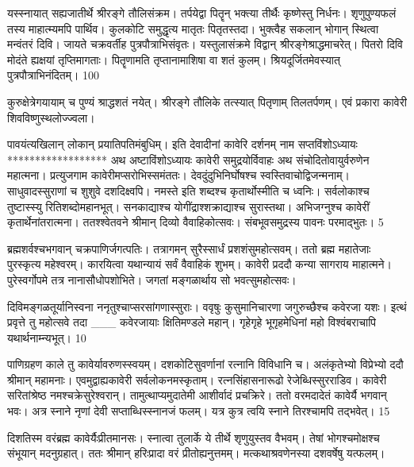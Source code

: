   यस्स्नायात् सह्यजातीर्थे श्रीरङ्गे तौलिसंक्रम।
 तर्पयेद्वा पितॄन् भक्त्या तीर्थैः कृष्णेस्तु निर्धनः।
 शृणुपुण्यफलं तस्य माहात्म्यमपि पार्थिव।
 कुलकोटि समुद्धृत्य मातृतः पितृतस्तदा।
 भुक्त्वैह सकलान् भोगान् स्थित्वा मन्वंतरं दिवि।
 जायते चक्रवर्तीह पुत्रपौत्राभिसंवृतः।
 यस्तुलासंक्रमे विद्वान् श्रीरङ्गेश्राद्धमाचरेत्।
 पितरो दिवि मोदंते ह्यक्षयां तृप्तिमागताः।
 पितॄणामति तृप्तानामाशिषा वा शतं कुलम्।
 श्रियदूर्जितमेवस्यात् पुत्रपौत्राभिनंदितम्।
 100

  कुरुक्षेत्रेगयायाम् च पुण्यं श्राद्धशतं नयेत्।
 श्रीरङ्गे तौलिके तत्स्यात् पितृणाम् तिलतर्पणम्।
 एवं प्रकारा कावेरी शिवविष्णुस्थलोज्ज्वला।
 
पावयंत्यखिलान् लोकान् प्रयातिपतिमंबुधिम्।
 इति देवादीनां कावेरि दर्शनम् नाम सप्तविंशोऽध्यायः
******************
अथ अष्टाविंशोऽध्यायः
कावेरी समुद्रयोर्विवाहः अथ संचोदितोवायुर्वरुणेन महात्मना।
 प्रत्युजगाम कावेरीमप्सरोभिस्समंततः।
 देवदुंदुभिनिर्घोषश्च स्वस्तिवाचोद्विजन्मनाम्।
 साधुवादस्सुराणां च शुशुवे दशदिक्ष्वपि।
 नमस्ते इति शब्दश्च कृतार्थोस्मीति च ध्वनिः।
 सर्वलोकाश्च तुष्टास्स्यु रितिशब्दोमहानभूत्।
 सनकाद्याश्च योगींद्राश्शक्राद्याश्च सुरास्तथा।
 अभिजग्नुश्च कावेरीं कृतार्थेनांतरात्मना।
 ततश्श्वेतवने श्रीमान् दिव्यो वैवाहिकोत्सवः।
 संबभूवसमुद्रस्य पावनः परमाद्भुतः।
 5

  ब्रह्मशर्वश्चभगवान् चक्रपाणिर्जगत्पतिः।
 तत्रागमन् सुरैस्सार्धं प्रशशंसुमहोत्सवम्।
 ततो ब्रह्म महातेजाः पुरस्कृत्य महेश्वरम्।
 कारयित्वा यथान्यायं सर्वं वैवाहिकं शुभम्।
 कावेरी प्रददौ कन्या सागराय माहात्मने।
 पुरेस्वर्गोपमे तत्र नानासौधोपशोभिते।
 जगतां मङ्गळार्थाय सो भवत्सुमहोत्सवः।
 
दिविमङ्गळतूर्यानिस्वना ननृतुश्चाप्सरसांगणास्सुराः।
 ववृषुः कुसुमानिचारणा जगुरुच्छैश्च कवेरजा यशः।
 इत्थं प्रवृत्ते तु महोत्सवे तदा
___ कवेरजायाः क्षितिमण्डले महान्।
 गृहेगृहे भूगृहमेधिनां महो
विश्वंबराचापि यथार्थनाम्न्यभूत्।
 10

  पाणिग्रहण काले तु कावेर्यावरुणस्स्वयम्।
 दशकोटिसुवर्णानां रत्नानि विविधानि च।
 अलंकृतेभ्यो विप्रेभ्यो ददौ श्रीमान् महामनाः।
 एवमुद्वाह्यकावेरी सर्वलोकनमस्कृताम्।
 रत्नसिंहासनारूढो रेजेब्धिस्सुरराडिव।
 कावेरी सरितांश्रेष्ठ नमश्चक्रेसुरेश्वरान्।
 तामुत्थाप्यमुदातेमी आशीर्वादं प्रचक्रिरे।
 ततो वरमदादेतं कावेर्यै भगवान् भवः।
 अत्र स्नाने नृणां देवी सप्ताब्धिस्स्नानजं फलम्।
 यत्र कुत्र त्वयि स्नाने तिरश्चामपि तद्भवेत्।
 15

  दिशतिस्म वरंब्रह्म कावेर्यैःप्रीतमानसः।
 स्नात्वा तुलार्के ये तीर्थे शृणुयुस्तव वैभवम्।
 तेषां भोगश्चमोक्षश्च संभूयान् मदनुग्रहात्।
 ततः श्रीमान् हरिःप्रादा वरं प्रीतोह्यनुत्तमम्।
 मत्कथाश्रवणेनस्या दशवर्षेषु यत्फलम्।
 

